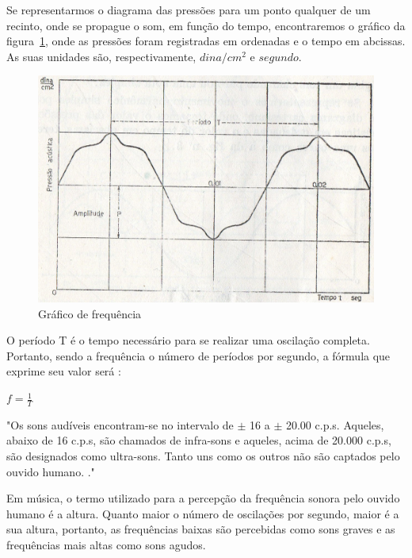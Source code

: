 Se representarmos o diagrama das pressões para um ponto qualquer de um recinto, onde se propague o som, em função do tempo, encontraremos o gráfico da figura~\ref{grafico_frequencia}, onde as pressões foram registradas em ordenadas e o tempo em abcissas. As suas unidades são, respectivamente, $ dina/cm^{2} $ e $ segundo $. \cite{silva}

\begin{figure}[!htb]
\centering
\includegraphics[scale=0.4]{figuras/grafico_frequencia}
\caption{Gráfico de frequência \cite{silva}}
\label{grafico_frequencia}
\end{figure}

O período T é o tempo necessário para se realizar uma oscilação completa. Portanto, sendo a frequência o número de períodos por segundo, a fórmula que exprime seu valor será \cite[pág.~7]{bistafa}:
\begin{center}
\begin{LARGE}
$ f = \frac{1}{T} $
\end{LARGE}
\end{center}

\begin{citacao}
\begin{normalsize}
"Os sons audíveis encontram-se no intervalo de $ \pm $ 16 a $ \pm $ 20.00 c.p.s. Aqueles, abaixo de 16 c.p.s, são chamados de infra-sons e aqueles, acima de 20.000 c.p.s, são designados como ultra-sons. Tanto uns como os outros não são captados pelo ouvido humano. \cite[pág.~35]{silva}." 
\end{normalsize}
\end{citacao}

Em música, o termo utilizado para a percepção da frequência sonora pelo ouvido humano é a altura. Quanto maior o número de oscilações por segundo, maior é a sua altura, portanto, as frequências baixas são percebidas como sons graves e as frequências mais altas como sons agudos.

